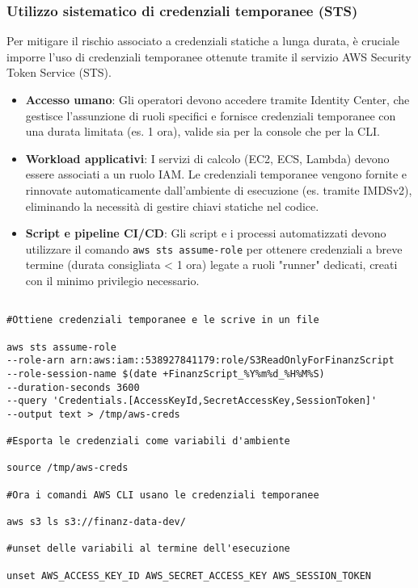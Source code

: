 \subsubsection{Utilizzo sistematico di credenziali temporanee (STS)}
Per mitigare il rischio associato a credenziali statiche a lunga durata, è cruciale imporre l'uso di credenziali temporanee ottenute tramite il servizio AWS Security Token Service (STS).
\begin{itemize}
\item \textbf{Accesso umano}: Gli operatori devono accedere tramite Identity Center, che gestisce l'assunzione di ruoli specifici e fornisce credenziali temporanee con una durata limitata (es. 1 ora), valide sia per la console che per la CLI.
\item \textbf{Workload applicativi}: I servizi di calcolo (EC2, ECS, Lambda) devono essere associati a un ruolo IAM. Le credenziali temporanee vengono fornite e rinnovate automaticamente dall'ambiente di esecuzione (es. tramite IMDSv2), eliminando la necessità di gestire chiavi statiche nel codice.
\item \textbf{Script e pipeline CI/CD}: Gli script e i processi automatizzati devono utilizzare il comando \lstinline|aws sts assume-role| per ottenere credenziali a breve termine (durata consigliata < 1 ora) legate a ruoli "runner" dedicati, creati con il minimo privilegio necessario.
\end{itemize}

\begin{lstlisting}[style=bash, caption={Esempio di Assume-Role in uno script CI}, label=lst:sts-script]

#Ottiene credenziali temporanee e le scrive in un file

aws sts assume-role
--role-arn arn:aws:iam::538927841179:role/S3ReadOnlyForFinanzScript
--role-session-name $(date +FinanzScript_%Y%m%d_%H%M%S)
--duration-seconds 3600
--query 'Credentials.[AccessKeyId,SecretAccessKey,SessionToken]'
--output text > /tmp/aws-creds

#Esporta le credenziali come variabili d'ambiente

source /tmp/aws-creds

#Ora i comandi AWS CLI usano le credenziali temporanee

aws s3 ls s3://finanz-data-dev/

#unset delle variabili al termine dell'esecuzione

unset AWS_ACCESS_KEY_ID AWS_SECRET_ACCESS_KEY AWS_SESSION_TOKEN
\end{lstlisting}

